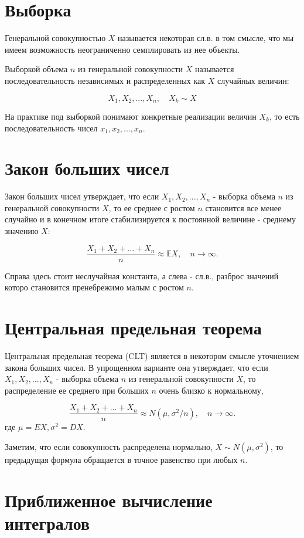 \section{Выборка}

Генеральной совокупностью $X$ называется некоторая сл.в. в том смысле, что мы имеем возможность неограниченно семплировать из нее объекты.

Выборкой объема $n$ из генеральной совокупности $X$ называется последовательность независимых и распределенных как $X$ случайных величин: 

$$
X_1, X_2, ..., X_n, \quad X_k \sim X
$$

На практике под выборкой понимают конкретные реализации величин $X_k$, то есть последовательность чисел $x_1, x_2, ..., x_n$.


\section{Закон больших чисел}

Закон больших чисел утверждает, что если $X_1, X_2, ..., X_n$ - выборка объема $n$ из генеральной совокупности $X$, то ее среднее с ростом $n$ становится все менее случайно и в конечном итоге стабилизируется к постоянной величине - среднему значению $X$:

$$
\frac{X_1+X_2+...+X_n}{n} \approx \mathbb{E}X, \quad n\rightarrow\infty.
$$ 

Справа здесь стоит неслучайная константа, а слева - сл.в., разброс значений которо становится пренебрежимо малым с ростом $n$.

\section{Центральная предельная теорема}

Центральная предельная теорема (CLT) является в некотором смысле уточнением закона больших чисел.
В упрощенном варианте она утверждает, что если $X_1, X_2, ..., X_n$ - выборка объема $n$ из генеральной совокупности $X$, то распределение ее среднего при больших $n$ очень близко к нормальному,  

$$
\frac{X_1+X_2+...+X_n}{n} \approx N(\mu, \sigma^2/n), \quad n\rightarrow\infty.
$$
где $\mu=EX, \sigma^2=DX$.

Заметим, что если совокупность распределена нормально, $X \sim N(\mu, \sigma^2)$, то предыдущая формула обращается в 
точное равенство при любых $n$.


\section{Приближенное вычисление интегралов}

